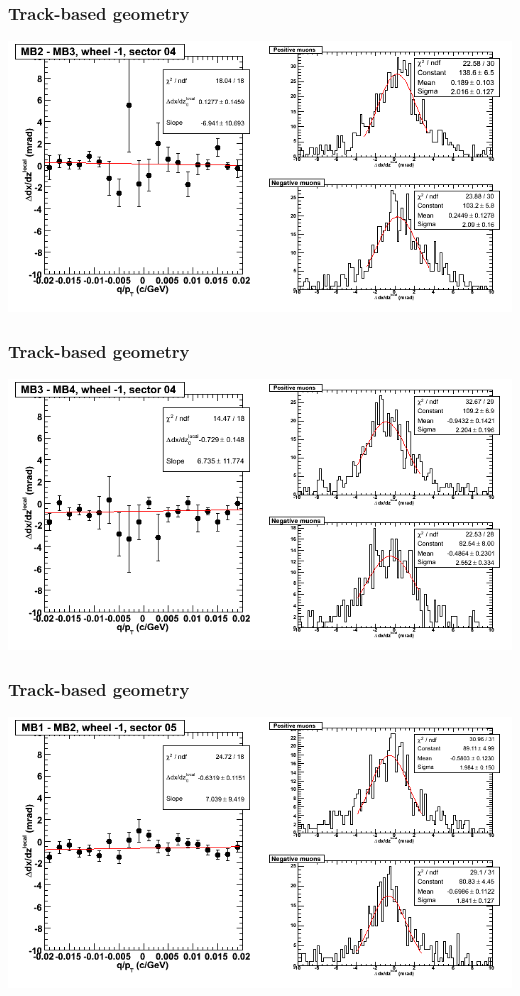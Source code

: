 \documentclass[compress]{beamer}
\begin{document}
\begin{frame}
\frametitle{Track-based geometry}
\includegraphics[width=\linewidth]{NOV4_segdiffs/dt13_slope_B_04_23.png}
\end{frame}

\begin{frame}
\frametitle{Track-based geometry}
\includegraphics[width=\linewidth]{NOV4_segdiffs/dt13_slope_B_04_34.png}
\end{frame}

\begin{frame}
\frametitle{Track-based geometry}
\includegraphics[width=\linewidth]{NOV4_segdiffs/dt13_slope_B_05_12.png}
\end{frame}
\end{document}
